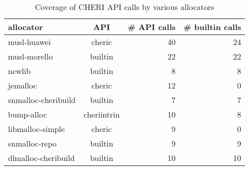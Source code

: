 \begin{table}[t]
\begin{center}
\begin{tabular}{lcrr}
\toprule
allocator & API & \# API calls & \# builtin calls \\
\midrule
musl-huawei & cheric & 40 & 24\\
musl-morello & builtin & 22 & 22\\
newlib & builtin & 8 & 8\\
jemalloc & cheric & 12 & 0\\
snmalloc-cheribuild & builtin & 7 & 7\\
bump-alloc & cheriintrin & 10 & 8\\
libmalloc-simple & cheric & 9 & 0\\
snmalloc-repo & builtin & 9 & 9\\
dlmalloc-cheribuild & builtin & 10 & 10
\\ \bottomrule
\end{tabular}
\caption{\label{tab:rq1}Coverage of CHERI API calls by various allocators}
\label{tab:atks}
\end{center}
\end{table}